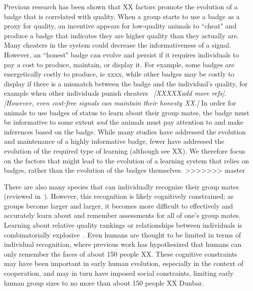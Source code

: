 
Previous research has been shown that XX factors promote the evolution of a badge that is correlated with quality. When a group starts to use a badge as a proxy for quality, an incentive appears for low-quality animals to ``cheat" and produce a badge that indicates they are higher quality than they actually are. Many cheaters in the system could decrease the informativeness of a signal. However, an ``honest" badge can evolve and persist if it requires individuals to pay a cost to produce, maintain, or display it. For example, some badges are energetically costly to produce, ie xxxx, while other badges may be costly to display if there is a mismatch between the badge and the individual's quality, for example when other individuals punish cheaters ~\cite{Smith2003AnimalSignals}\textit{[XXXXXadd more refs]}.  \textit{[However, even cost-free signals can maintain their honesty \cite{Dawkins:1991ly}XX.]} In order for animals to use badges of status to learn about their group mates, the badge must be informative to some extent \emph{and} the animals must pay attention to and make inferences based on the badge. While many studies have addressed the evolution and maintenance of a highly informative badge, fewer have addressed the evolution of the required type of learning (although see XX).  We therefore focus on the factors that might lead to the evolution of a learning system that relies on badges, rather than the evolution of the badges themselves.
>>>>>>> master

There are also many species that can individually recognize their group mates (reviewed in~\cite{Tibbetts2007IndividualDifferent,Wiley2013SpecificityBehaviour}). However, this recognition is likely cognitively constrained; as groups become larger and larger, it becomes more difficult to effectively and accurately learn about and remember assessments for all of one's group mates. Learning about relative quality rankings or relationships between individuals is combinatorially explosive~\cite{Seyfarth2015SocialCognition}. Even humans are thought to be limited in terms of individual recognition, where previous work has hypothesized that humans can only remember the faces of about 150 people XX. These cognitive constraints may have been important in early human evolution, especially in the context of cooperation, and may in turn have imposed social constraints, limiting early human group sizes to no more than about 150 people XX Dunbar.

